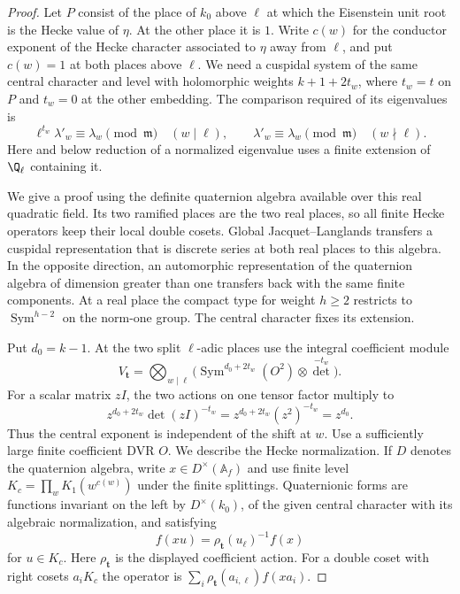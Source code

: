 \begin{proof}
Let \(P\) consist of the place of \(k_0\) above \(\ell\)
at which the Eisenstein unit root is the Hecke value of
\(\eta\). At the other place it is \(1\). Write \(c(w)\)
for the conductor exponent of the Hecke character associated
to \(\eta\) away from \(\ell\), and put \(c(w)=1\) at both
places above \(\ell\). We need a cuspidal system of the
same central character and level with holomorphic weights
\(k+1+2t_w\), where \(t_w=t\) on \(P\) and \(t_w=0\)
at the other embedding. The comparison required of its
eigenvalues is
\[
 \ell^{t_w}\lambda'_w\equiv\lambda_w\pmod{\mathfrak m}
       \quad(w\mid\ell),\qquad
 \lambda'_w\equiv\lambda_w\pmod{\mathfrak m}
       \quad(w\nmid\ell).
\]
Here and below reduction of a normalized eigenvalue uses a
finite extension of \(\Q_\ell\) containing it.

We give a proof using the definite quaternion algebra available
over this real quadratic field. Its two ramified places are
the two real places, so all finite Hecke operators keep their
local double cosets. Global Jacquet--Langlands transfers a
cuspidal representation that is discrete series at both real
places to this algebra. In the opposite direction, an
automorphic representation of the quaternion algebra of
dimension greater than one transfers back with the same finite
components. At a real place the compact type for weight
\(h\ge2\) restricts to \(\operatorname{Sym}^{h-2}\) on the
norm-one group. The central character fixes its extension.
\hfill\mbox{\cite{jacquet-langlands}}

Put \(d_0=k-1\). At the two split \(\ell\)-adic places use
the integral coefficient module
\[
 V_{\mathbf t}=\bigotimes_{w\mid\ell}
       \bigl(\operatorname{Sym}^{d_0+2t_w}(O^2)\otimes\det^{-t_w}\bigr).
\]
For a scalar matrix \(zI\), the two actions on one tensor factor multiply to
\[
 z^{d_0+2t_w}\det(zI)^{-t_w}
 =z^{d_0+2t_w}(z^2)^{-t_w}=z^{d_0}.
\]
Thus the central exponent is independent of the shift at \(w\). Use a sufficiently large finite
coefficient DVR \(O\). We describe the
Hecke normalization. If \(D\) denotes the quaternion algebra,
write \(x\in D^\times(\mathbb A_f)\) and use finite level
\(K_c=\prod_w K_1(w^{c(w)})\) under the finite splittings.
Quaternionic forms are functions invariant on the left by
\(D^\times(k_0)\), of the given central character with its
algebraic normalization, and satisfying
\[
 f(xu)=\rho_{\mathbf t}(u_\ell)^{-1}f(x)
\]
for \(u\in K_c\).
Here \(\rho_{\mathbf t}\) is the displayed coefficient action.
For a double coset with right cosets \(a_iK_c\) the operator
is \(\sum_i\rho_{\mathbf t}(a_{i,\ell})f(xa_i)\).


\end{proof}
